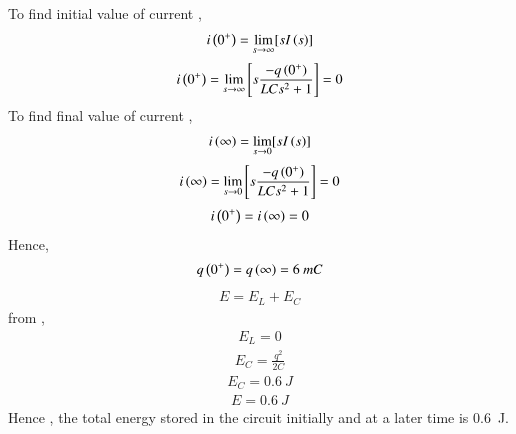 \documentclass[beamer]{IEEEtran}
\theoremstyle{remark}
\begin{document}
\vspace{10pt}
To find initial value of current ,
\begin{align}
    i\left(0^{+}\right)=\lim_{s\to\infty}[sI\left(s\right)]
\end{align}
\begin{align}
    i\left(0^{+}\right)=\lim_{s\to\infty}\left[s\frac{-q\left(0^{+}\right)}{LCs^2+1}\right]=0
\end{align}
\vspace{10pt}
To find final value of current ,
\begin{align}
     i\left(\infty\right)=\lim_{s\to0}[sI\left(s\right)]
\end{align}
\begin{align}
   i\left(\infty\right)=\lim_{s\to0}\left[s\frac{-q\left(0^{+}\right)}{LCs^2+1}\right]=0 
\end{align}
\begin{align}
    i\left(0^{+}\right)=i\left(\infty\right)=0
\end{align}
Hence,
\begin{align}
    q\left(0^{+}\right)=q\left(\infty\right)=6\ mC
\end{align}
\begin{align}
    E=E_L+E_C
\end{align}
from ,
\begin{align}
    E_L=0
\end{align}
\begin{align}
    E_C=\frac{q^2}{2C}
\end{align}
\begin{align}
    E_C=0.6\ J
\end{align}
\begin{align}
    E=0.6\ J
\end{align}
Hence , the total energy stored in the circuit initially and at a later time is 0.6\ J.
\end{document}

